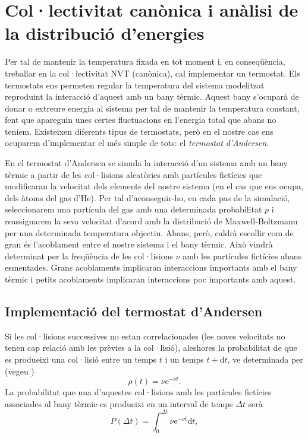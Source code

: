 \documentclass[a4paper,10.5pt]{report}
\begin{document}
\section{Col·lectivitat canònica i anàlisi de la distribució d'energies}
Per tal de mantenir la temperatura fixada en tot moment i, en conseqüència, treballar en la col·lectivitat NVT (canònica), cal implementar un termostat. Els termostats ens permeten regular la temperatura del sistema modelitzat reproduint la interacció d'aquest amb un bany tèrmic. Aquest bany s'ocuparà de donar o extreure energia al sistema per tal de mantenir la temperatura constant, fent que apareguin unes certes fluctuacions en l'energia total que abans no teníem. Existeixen diferents tipus de termostats, però en el nostre cas ens ocuparem d'implementar el més simple de tots: el \textit{termostat d'Andersen}.

En el termostat d'Andersen\cite{ref2} se simula la interacció d'un sistema amb un bany tèrmic a partir de les col·lisions aleatòries amb partícules fictícies que modificaran la velocitat dels elements del nostre sistema (en el cas que ens ocupa, dels àtoms del gas d'He). Per tal d'aconseguir-ho, en cada pas de la simulació, seleccionarem una partícula del gas amb una determinada probabilitat $p$ i reassignarem la seva velocitat d'acord amb la distribució de Maxwell-Boltzmann per una determinada temperatura objectiu. Abans, però, caldrà escollir com de gran és l'acoblament entre el nostre sistema i el bany tèrmic. Això vindrà determinat per la freqüència de les col·lisions $\nu$ amb les partícules fictícies abans esmentades. Grans acoblaments implicaran interaccions importants amb el bany tèrmic i petits acoblaments implicaran interaccions poc importants amb aquest. 

\subsection{Implementació del termostat d'Andersen}

Si les col·lisions successives no estan correlacionades (les noves velocitats no tenen cap relació amb les prèvies a la col·lisió), aleshores la probabilitat de que es produeixi una col·lisió entre un temps $t$ i un temps $t+\mathrm{d}t$, ve determinada per (vegeu \cite{ref3})
\begin{equation}
	\rho(t) = \nu \mathrm{e}^{-\nu t}.
\end{equation}
La probabilitat que una d'aquestes col·lisions amb les partícules fictícies associades al bany tèrmic es produeixi en un interval de temps $\Delta t$ serà
\begin{equation}
	P(\Delta t) = \int_{0}^{\Delta t} \nu \mathrm{e}^{-\nu t} \mathrm{d}t,
\end{equation}
\end{document}
